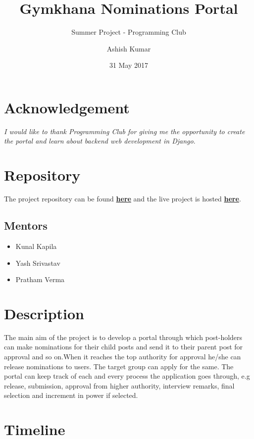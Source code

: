 \documentclass[12pt,a4paper]{scrartcl}
\title{\textbf{Gymkhana Nominations Portal}}
\subtitle{Summer Project - Programming Club}
\date{31 May 2017}
\author{Ashish Kumar}
\begin{document}
\maketitle

\section{Acknowledgement}
\textit{I would like to thank Programming Club for giving me the opportunity to create the portal and learn about backend web development in Django}.

\section{Repository}
The project repository can be found \textbf{\href{https://github.com/SummerCamp17/Gymkhana-Nominations}{here}} and the live project is hosted \textbf{\href{https://gymkhana.pythonanywhere.com}{here}}.

\subsection{Mentors}
\begin{itemize}
	\item Kunal Kapila
	\item Yash Srivastav
	\item Pratham Verma
\end{itemize}


\section{Description}
The main aim of the project is to develop a portal through which post-holders can make nominations for their child posts and send it to their parent post for approval and so on.When it reaches the top authority for approval he/she can release nominations to users. The target group can apply for the same. The portal can keep track of each and every process the application goes through, e.g release, submission, approval from higher authority, interview remarks, final selection and increment in power if selected.
\section{Timeline}
\end{document}
